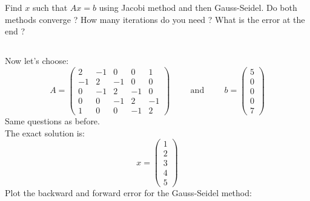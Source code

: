 Find $x$ such that $Ax = b$ using Jacobi method and then Gauss-Seidel. Do both methods converge ? How many iterations do you need ? What is the error at the end ?

\subsection{} Now let's choose:
$$ A = 
\left(\begin{matrix}
2& -1& 0& 0& 1\\
    -1& 2& -1& 0& 0\\
    0& -1& 2& -1& 0\\
    0& 0& -1& 2& -1\\
    1& 0& 0& -1& 2
\end{matrix} \right)\hspace{1cm} \text{and} \hspace{1cm}
b = \left(\begin{matrix}
5\\
0\\
0\\
0\\
7
\end{matrix} \right)
$$
Same questions as before.\\
The exact solution is:
$$ x = \left(\begin{matrix}
1\\
2\\
3\\
4\\
5
\end{matrix} \right)
$$
Plot the backward and forward error for the Gauss-Seidel method:
\fi
